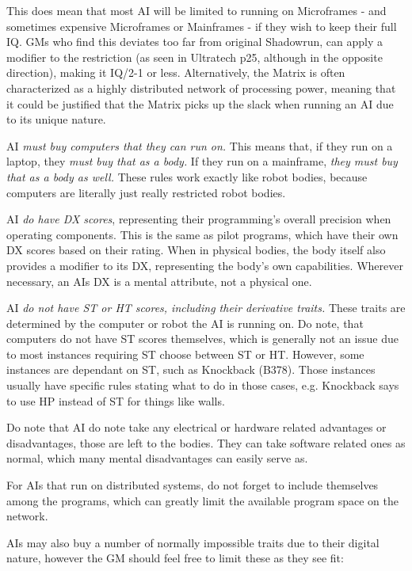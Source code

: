 \begin{multicols*}{3}
	This does mean that most AI will be limited to running on Microframes - and sometimes expensive Microframes or Mainframes - if they wish to keep their full IQ. GMs who find this deviates too far from original Shadowrun, can apply a modifier to the restriction (as seen in Ultratech p25, although in the opposite direction), making it IQ/2-1 or less. Alternatively, the Matrix is often characterized as a highly distributed network of processing power, meaning that it could be justified that the Matrix picks up the slack when running an AI due to its unique nature.
	
	AI \textit{must buy computers that they can run on.} This means that, if they run on a laptop, they \textit{must buy that as a body.} If they run on a mainframe, \textit{they must buy that as a body as well.} These rules work exactly like robot bodies, because computers are literally just really restricted robot bodies.
	
	AI \textit{do have DX scores}, representing their programming's overall precision when operating components. This is the same as pilot programs, which have their own DX scores based on their rating. When in physical bodies, the body itself also provides a modifier to its DX, representing the body's own capabilities. Wherever necessary, an AIs DX is a mental attribute, not a physical one.
	
	AI \textit{do not have ST or HT scores, including their derivative traits.} These traits are determined by the computer or robot the AI is running on. Do note, that computers do not have ST scores themselves, which is generally not an issue due to most instances requiring ST choose between ST or HT. However, some instances are dependant on ST, such as Knockback (B378). Those instances usually have specific rules stating what to do in those cases, e.g. Knockback says to use HP instead of ST for things like walls.
	
	Do note that AI do note take any electrical or hardware related advantages or disadvantages, those are left to the bodies. They can take software related ones as normal, which many mental disadvantages can easily serve as.
	
	For AIs that run on distributed systems, do not forget to include themselves among the programs, which can greatly limit the available program space on the network.
	
	AIs may also buy a number of normally impossible traits due to their digital nature, however the GM should feel free to limit these as they see fit:
	

\end{multicols*}
